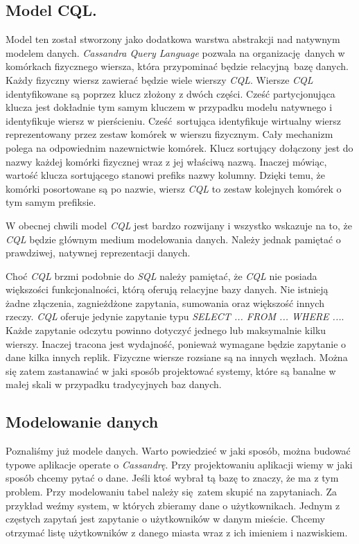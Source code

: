 \documentclass[oneside, 11pt, a4paper]{article}
\begin{document}
\begin{multicols}{2}
\subsection{Model CQL.}
Model ten został stworzony jako dodatkowa warstwa abstrakcji nad natywnym modelem danych. \emph{Cassandra Query Language} pozwala na organizację danych w komórkach fizycznego wiersza, która przypominać będzie relacyjną bazę danych. Każdy fizyczny wiersz zawierać będzie wiele wierszy \emph{CQL}. Wiersze \emph{CQL} identyfikowane są poprzez klucz złożony z dwóch części. Cześć partycjonująca klucza jest dokładnie tym samym kluczem w przypadku modelu natywnego i identyfikuje wiersz w pierścieniu. Cześć sortująca identyfikuje wirtualny wiersz reprezentowany przez zestaw komórek w wierszu fizycznym. Cały mechanizm polega na odpowiednim nazewnictwie komórek. Klucz sortujący dołączony jest do nazwy każdej komórki fizycznej wraz z jej właściwą nazwą. Inaczej mówiąc, wartość klucza sortującego stanowi prefiks nazwy kolumny. Dzięki temu, że komórki posortowane są po nazwie, wiersz \emph{CQL} to zestaw kolejnych komórek o tym samym prefiksie.

W obecnej chwili model \emph{CQL} jest bardzo rozwijany i wszystko wskazuje na to, że \emph{CQL} będzie głównym medium modelowania danych. Należy jednak pamiętać o prawdziwej, natywnej reprezentacji danych.

Choć \emph{CQL} brzmi podobnie do \emph{SQL} należy pamiętać, że \emph{CQL} nie posiada większości funkcjonalności, którą oferują relacyjne bazy danych. Nie istnieją żadne złączenia, zagnieżdżone zapytania, sumowania oraz większość innych rzeczy. \emph{CQL} oferuje jedynie zapytanie typu \emph{SELECT ... FROM ... WHERE ...}. Każde zapytanie odczytu powinno dotyczyć jednego lub maksymalnie kilku wierszy. Inaczej tracona jest wydajność, ponieważ wymagane będzie zapytanie o dane kilka innych replik. Fizyczne wiersze rozsiane są na innych węzłach. Można się zatem zastanawiać w jaki sposób projektować systemy, które są banalne w małej skali w przypadku tradycyjnych baz danych.

\subsection{Modelowanie danych}
Poznaliśmy już modele danych. Warto powiedzieć w jaki sposób, można budować typowe aplikacje operate o \emph{Cassandrę}. Przy projektowaniu aplikacji wiemy w jaki sposób chcemy pytać o dane. Jeśli ktoś wybrał tą bazę to znaczy, że ma z tym problem. Przy modelowaniu tabel należy się zatem skupić na zapytaniach. Za przykład weźmy system, w których zbieramy dane o użytkownikach. Jednym z częstych zapytań jest zapytanie o użytkowników w danym mieście. Chcemy otrzymać listę użytkowników z danego miasta wraz z ich imieniem i nazwiskiem.


\end{multicols}
\end{document}
